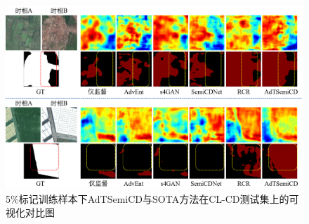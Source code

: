\documentclass[lang=chs, degree=master, blindreview=false, adobe=false]{yanputhesis}
\begin{document}
\begin{figure}[!htbp]
  \centering
  \includegraphics[scale=0.45]{images/AdTcl-vis.png}
  \caption{
    5$\%$标记训练样本下AdTSemiCD与SOTA方法在CL-CD测试集上的可视化对比图
  }
  \label{fig:AdTCl-vis}
\end{figure}
\end{document}
